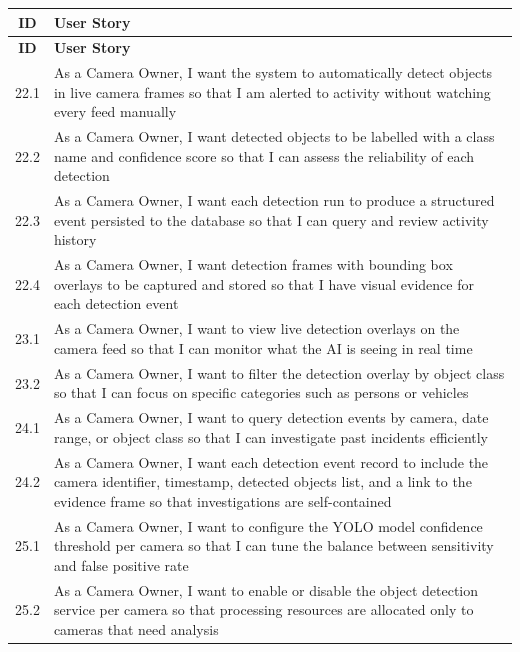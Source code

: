 \begin{longtable}{|>{\small}c|>{\small\raggedright\arraybackslash}p{11.5cm}|}
\hline
\textbf{ID} & \textbf{User Story} \\ \hline
\endfirsthead \hline \textbf{ID} & \textbf{User Story} \\ \hline
\endhead \hline
\endfoot \hline
\endlastfoot

22.1 & As a Camera Owner, I want the system to automatically detect objects in live camera frames so that I am alerted to activity without watching every feed manually \\ \hline
22.2 & As a Camera Owner, I want detected objects to be labelled with a class name and confidence score so that I can assess the reliability of each detection \\ \hline
22.3 & As a Camera Owner, I want each detection run to produce a structured event persisted to the database so that I can query and review activity history \\ \hline
22.4 & As a Camera Owner, I want detection frames with bounding box overlays to be captured and stored so that I have visual evidence for each detection event \\ \hline
23.1 & As a Camera Owner, I want to view live detection overlays on the camera feed so that I can monitor what the AI is seeing in real time \\ \hline
23.2 & As a Camera Owner, I want to filter the detection overlay by object class so that I can focus on specific categories such as persons or vehicles \\ \hline
24.1 & As a Camera Owner, I want to query detection events by camera, date range, or object class so that I can investigate past incidents efficiently \\ \hline
24.2 & As a Camera Owner, I want each detection event record to include the camera identifier, timestamp, detected objects list, and a link to the evidence frame so that investigations are self-contained \\ \hline
25.1 & As a Camera Owner, I want to configure the YOLO model confidence threshold per camera so that I can tune the balance between sensitivity and false positive rate \\ \hline
25.2 & As a Camera Owner, I want to enable or disable the object detection service per camera so that processing resources are allocated only to cameras that need analysis \\ \hline

\end{longtable}
